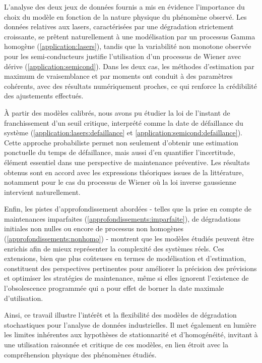 \documentclass[11pt,a4paper]{article}
\begin{document}
L’analyse des deux jeux de données fournis a mis en évidence l’importance du choix du modèle en fonction de la nature physique du phénomène observé. Les données relatives aux lasers, caractérisées par une dégradation strictement croissante, se prêtent naturellement à une modélisation par un processus Gamma homogène (\ref{application:lasers}), tandis que la variabilité non monotone observée pour les semi-conducteurs justifie l’utilisation d’un processus de Wiener avec dérive (\ref{application:semicond}). Dans les deux cas, les méthodes d’estimation par maximum de vraisemblance et par moments ont conduit à des paramètres cohérents, avec des résultats numériquement proches, ce qui renforce la crédibilité des ajustements effectués.

À partir des modèles calibrés, nous avons pu étudier la loi de l’instant de franchissement d’un seuil critique, interprété comme la date de défaillance du système (\ref{application:lasers:defaillance} et \ref{application:semicond:defaillance}). Cette approche probabiliste permet non seulement d’obtenir une estimation ponctuelle du temps de défaillance, mais aussi d’en quantifier l’incertitude, élément essentiel dans une perspective de maintenance préventive. Les résultats obtenus sont en accord avec les expressions théoriques issues de la littérature, notamment pour le cas du processus de Wiener où la loi inverse gaussienne intervient naturellement.

Enfin, les pistes d’approfondissement abordées - telles que la prise en compte de maintenances imparfaites (\ref{approfondissements:imparfaite}), de dégradations initiales non nulles ou encore de processus non homogènes (\ref{approfondissements:nonhomo}) - montrent que les modèles étudiés peuvent être enrichis afin de mieux représenter la complexité des systèmes réels. Ces extensions, bien que plus coûteuses en termes de modélisation et d’estimation, constituent des perspectives pertinentes pour améliorer la précision des prévisions et optimiser les stratégies de maintenance, même si elles ignorent l'existence de l'obsolescence programmée qui a pour effet de borner la date maximale d'utilisation.

Ainsi, ce travail illustre l’intérêt et la flexibilité des modèles de dégradation stochastiques pour l’analyse de données industrielles. Il met également en lumière les limites inhérentes aux hypothèses de stationnarité et d’homogénéité, invitant à une utilisation raisonnée et critique de ces modèles, en lien étroit avec la compréhension physique des phénomènes étudiés.


  
\clearpage
{} %
\end{document}
